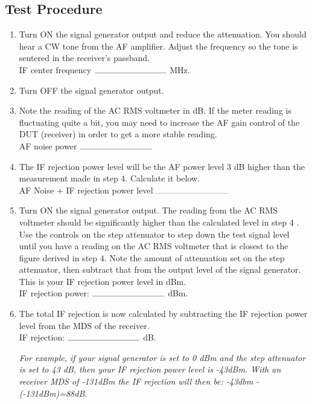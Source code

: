 \documentclass[10pt,letterpaper]{book}
\begin{document}
\subsection*{Test Procedure}
\begin{enumerate}
	\item Turn ON the signal generator output and reduce the attenuation. You should hear a CW tone from the AF amplifier. Adjust the frequency so the tone is sentered in the receiver's passband.
	\vspace{30pt}
	\\IF center frequency $\rule{3cm}{0.1mm}$ MHz.

	\item Turn OFF the signal generator output.

	\item Note the reading of the AC RMS voltmeter in dB. If the meter reading is fluctuating quite a bit, you may need to increase the AF gain control of the DUT (receiver) in order to get a more stable reading.
	\vspace{30pt}
	\\AF noise power $\rule{3cm}{0.1mm}$ 

	\item  The IF rejection power level will be the AF power level 3 dB higher than the measurement made in step 4. Calculate it below.
	\vspace{30pt}
	\\AF Noise + IF rejection power level $\rule{3cm}{0.1mm}$ 

	\item Turn ON the signal generator output. The reading from the AC RMS voltmeter should be significantly higher than the calculated level in step 4 . Use the controls on the step attenuator to step down the test signal level until you have a reading on the AC RMS voltmeter that is closest to the figure derived in step 4. Note the amount of attenuation set on the step attenuator, then subtract that from the output level of the signal generator. This is your IF rejection power level in dBm.
	\vspace{30pt}
	\\IF rejection power: $\rule{3cm}{0.1mm}$ dBm.
	 
	\item  The total IF rejection is now calculated by subtracting the IF rejection power level from the MDS of the receiver.
	\vspace{30pt}
	 \\IF rejection: $\rule{3cm}{0.1mm}$ dB.

	\emph{For example, if your signal generator is set to 0 dBm and the step attenuator is set to 43 dB, then your IF rejection power level is -43dBm. With an receiver MDS of -131dBm the IF rejection will then be: -43dbm -(-131dBm)=88dB.}
\end{enumerate}
\end{document}
